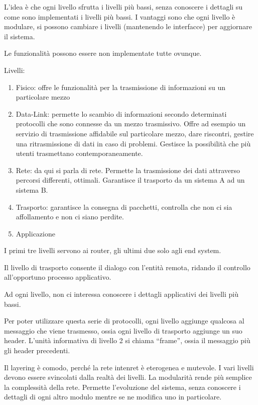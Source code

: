 L'idea \`e che ogni livello sfrutta i livelli pi\`u bassi, senza conoscere i dettagli su come sono implementati i livelli pi\`u bassi. I vantaggi sono che ogni livello \`e modulare, si possono cambiare i livelli (mantenendo le interfacce) per aggiornare il sistema.

Le funzionalit\`a possono essere non implementate tutte ovunque.

Livelli:
\begin{enumerate}
    \item Fisico: offre le funzionalit\`a per la trasmissione di informazioni su un particolare mezzo
    \item Data-Link: permette lo scambio di informazioni secondo determinati protocolli che sono connesse da un mezzo trasmissivo. Offre ad esempio un servizio di trasmissione affidabile sul particolare mezzo, dare riscontri, gestire una ritrasmissione di dati in caso di problemi. Gestisce la possibilit\`a che pi\`u utenti trasmettano contemporaneamente.
    \item Rete: da qui si parla di rete. Permette la trasmissione dei dati attraverso percorsi differenti, ottimali. Garantisce il trasporto da un sistema A ad un sistema B.
    \item Trasporto: garantisce la consegna di pacchetti, controlla che non ci sia affollamento e non ci siano perdite.
    \item Applicazione
\end{enumerate}

I primi tre livelli servono ai router, gli ultimi due solo agli end system.

Il livello di trasporto consente il dialogo con l'entit\`a remota, ridando il controllo all'opportuno processo applicativo.

Ad ogni livello, non ci interessa conoscere i dettagli applicativi dei livelli pi\`u bassi.

Per poter utilizzare questa serie di protocolli, ogni livello aggiunge qualcosa al messaggio che viene trasmesso, ossia ogni livello di trasporto aggiunge un suo header. L'unit\`a informativa di livello 2 si chiama ``frame'', ossia il messaggio pi\`u gli header precedenti.

Il layering \`e comodo, perch\'e la rete intenret \`e eterogenea e mutevole. I vari livelli devono essere svincolati dalla realt\`a dei livelli. La modularit\`a rende pi\`u semplice la complessit\`a della rete. Permette l'evoluzione del sistema, senza conoscere i dettagli di ogni altro modulo mentre se ne modifica uno in particolare.

